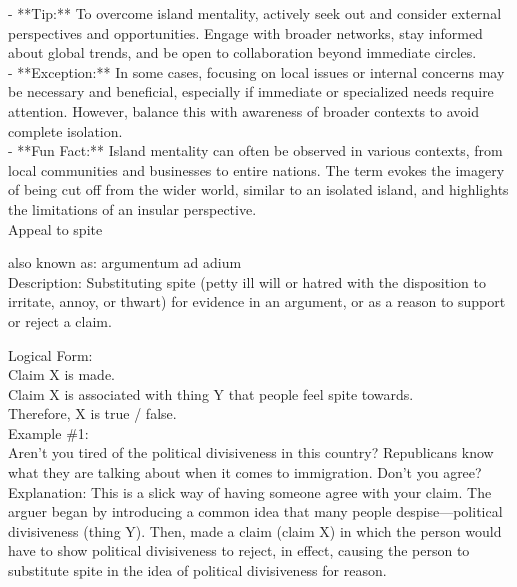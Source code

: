 \documentclass[a4paper,12pt,single,pdftex]{scrartcl}
\begin{document}
    
      - **Tip:** To overcome island mentality, actively seek out and consider external perspectives and opportunities. Engage with broader networks, stay informed about global trends, and be open to collaboration beyond immediate circles.
    \\

    
      - **Exception:** In some cases, focusing on local issues or internal concerns may be necessary and beneficial, especially if immediate or specialized needs require attention. However, balance this with awareness of broader contexts to avoid complete isolation.
    \\

    
      - **Fun Fact:** Island mentality can often be observed in various contexts, from local communities and businesses to entire nations. The term evokes the imagery of being cut off from the wider world, similar to an isolated island, and highlights the limitations of an insular perspective.
    \\

  

Appeal to spite
    
      also known as: argumentum ad adium
    \\

  
    Description: Substituting spite (petty ill will or hatred with the disposition to irritate, annoy, or thwart) for evidence in an argument, or as a reason to support or reject a claim.

    
      Logical Form:
    \\

    
      Claim X is made.
    \\

    
      Claim X is associated with thing Y that people feel spite towards.
    \\

    
      Therefore, X is true / false.
    \\

    
      Example \#1:
    \\

    
      Aren't you tired of the political divisiveness in this country? Republicans know what they are talking about when it comes to immigration. Don't you agree?
    \\

    
      Explanation: This is a slick way of having someone agree with your claim. The arguer began by introducing a common idea that many people despise—political divisiveness (thing Y). Then, made a claim (claim X) in which the person would have to show political divisiveness to reject, in effect, causing the person to substitute spite in the idea of political divisiveness for reason.
    \\
\end{document}
